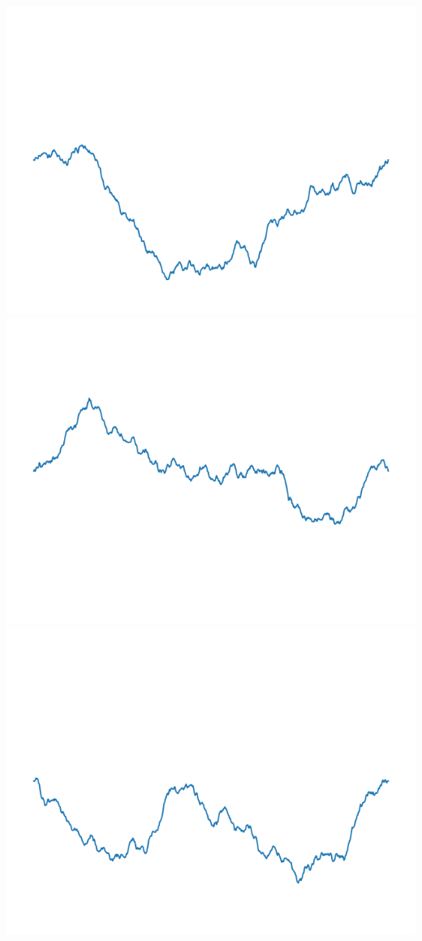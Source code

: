 \documentclass[11pt,class=report,crop=false]{standalone}
\begin{document}
\begin{exemple}
\begin{center}
\includegraphics[scale=\myscale,scale=0.3]{figures/landscape-04-4}
\includegraphics[scale=\myscale,scale=0.3]{figures/landscape-04-2}
\includegraphics[scale=\myscale,scale=0.3]{figures/landscape-04-5}
\end{center}

\end{exemple}
\end{document}
